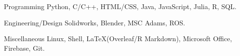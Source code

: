 

\begin{cvskills}

  \cvskill
    {Programming} %
    {Python, C/C++, HTML/CSS, Java, JavaScript, Julia, R, SQL.} %

\cvskill
{Engineering/Design} %
{Solidworks, Blender, MSC Adams, ROS.} %

  \cvskill
    {Miscellaneous} %
    {Linux, Shell, \LaTeX (Overleaf/R Markdown), Microsoft Office, Firebase, Git.} %
   


\end{cvskills}

